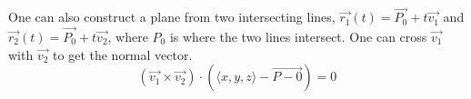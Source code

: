 \noindent
One can also construct a plane from two intersecting lines, $\vec{r_1}(t) = \vec{P_0} + t\vec{v_1}$ and $\vec{r_2}(t) = \vec{P_0} + t\vec{v_2}$, where $P_0$ is where the two lines intersect. One can cross $\vec{v_1}$ with $\vec{v_2}$ to get the normal vector.
\begin{equation*}
	\left(\vec{v_1} \times \vec{v_2}\right) \cdot \left(\langle x,y,z \rangle - \vec{P-0}\right) = 0
\end{equation*}